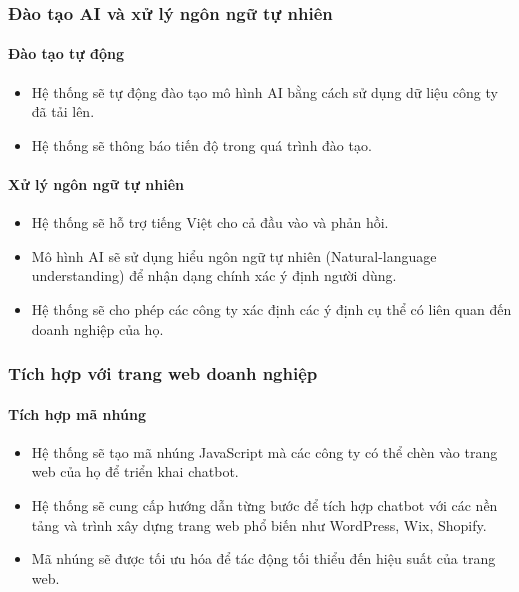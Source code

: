 \subsubsection{Đào tạo AI và xử lý ngôn ngữ tự nhiên}

\paragraph{Đào tạo tự động}
\begin{itemize}
    \item Hệ thống sẽ tự động đào tạo mô hình AI bằng cách sử dụng dữ liệu công ty đã tải lên.
    \item Hệ thống sẽ thông báo tiến độ trong quá trình đào tạo.
\end{itemize}

\paragraph{Xử lý ngôn ngữ tự nhiên}
\begin{itemize}
    \item Hệ thống sẽ hỗ trợ tiếng Việt cho cả đầu vào và phản hồi.
    \item Mô hình AI sẽ sử dụng hiểu ngôn ngữ tự nhiên (Natural-language understanding) để nhận dạng chính xác ý định người dùng.
    \item Hệ thống sẽ cho phép các công ty xác định các ý định cụ thể có liên quan đến doanh nghiệp của họ.
\end{itemize}

\subsubsection{Tích hợp với trang web doanh nghiệp}

\paragraph{Tích hợp mã nhúng}
\begin{itemize}
    \item Hệ thống sẽ tạo mã nhúng JavaScript mà các công ty có thể chèn vào trang web của họ để triển khai chatbot.
    \item Hệ thống sẽ cung cấp hướng dẫn từng bước để tích hợp chatbot với các nền tảng và trình xây dựng trang web phổ biến như WordPress, Wix, Shopify.
    \item Mã nhúng sẽ được tối ưu hóa để tác động tối thiểu đến hiệu suất của trang web.
\end{itemize}

